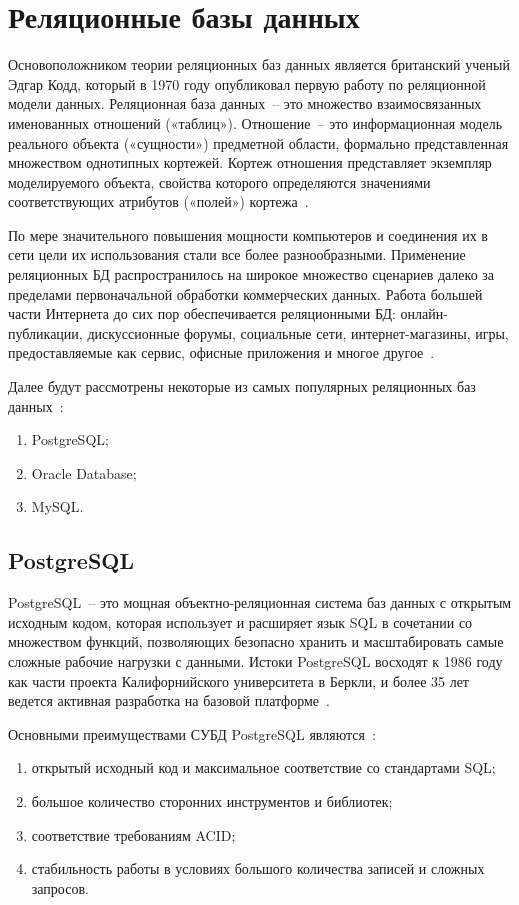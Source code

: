 \section{Реляционные базы данных}

Основоположником теории реляционных баз данных является британский ученый Эдгар Кодд, который в 1970 году опубликовал первую работу по реляционной модели данных.
Реляционная база данных~-- это множество взаимосвязанных именованных отношений («таблиц»).
Отношение~-- это информационная модель реального объекта («сущности») предметной области, формально представленная множеством однотипных кортежей.
Кортеж отношения представляет экземпляр моделируемого объекта, свойства которого определяются значениями соответствующих атрибутов («полей») кортежа~\cite{baseDB}.

По мере значительного повышения мощности компьютеров и соединения их в сети цели их использования стали все более разнообразными.
Применение реляционных БД распространилось на широкое множество сценариев далеко за пределами первоначальной обработки коммерческих данных.
Работа большей части Интернета до сих пор обеспечивается реляционными БД: онлайн-публикации, дискуссионные форумы, социальные сети, интернет-магазины, игры, предоставляемые как сервис, офисные приложения и многое другое~\cite{highloadApps}.

Далее будут рассмотрены некоторые из самых популярных реляционных баз данных~\cite{popularDB}:
\begin{enumerate}
	\item PostgreSQL;
	\item Oracle Database;
	\item MySQL.
\end{enumerate}

\subsection{PostgreSQL}

PostgreSQL~-- это мощная объектно-реляционная система баз данных с открытым исходным кодом, которая использует и расширяет язык SQL в сочетании со множеством функций, позволяющих безопасно хранить и масштабировать самые сложные рабочие нагрузки с данными.
Истоки PostgreSQL восходят к 1986 году как части проекта Калифорнийского университета в Беркли, и более 35 лет ведется активная разработка на базовой платформе~\cite{postgresql}.

Основными преимуществами СУБД PostgreSQL являются~\cite{cmpSCDB1, cmpSCDB2, cmpSCDB3}:
\begin{enumerate}
	\item открытый исходный код и максимальное соответствие со стандартами SQL;
	\item большое количество сторонних инструментов и библиотек;
	\item соответствие требованиям ACID;
	\item стабильность работы в условиях большого количества записей и сложных запросов.
\end{enumerate}

